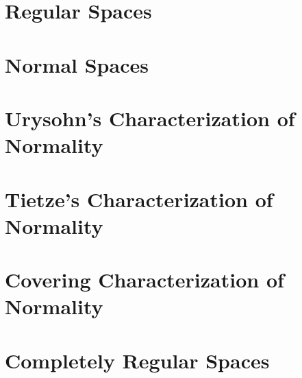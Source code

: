 \section{Regular Spaces}

\section{Normal Spaces}

\section{Urysohn's Characterization of Normality}

\section{Tietze's Characterization of Normality}

\section{Covering Characterization of Normality}

\section{Completely Regular Spaces}
